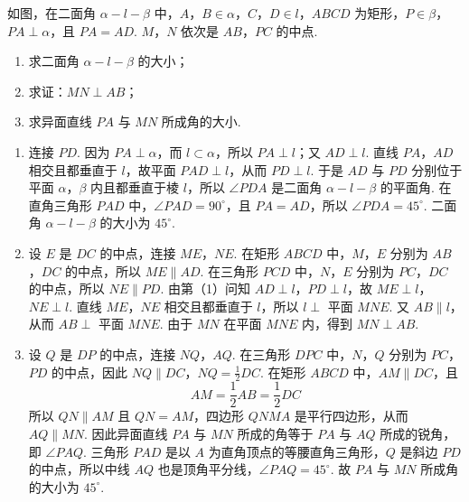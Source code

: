 \begin{problem}
如图，在二面角 \(\alpha-l-\beta\) 中，\(A\)，\(B\in\alpha\)，\(C\)，\(D\in l\)，\(ABCD\) 为矩形，\(P\in\beta\)，\(PA\perp\alpha\)，且 \(PA=AD\). \(M\)，\(N\) 依次是 \(AB\)，\(PC\) 的中点.

\begin{enumerate}
\item 求二面角 \(\alpha-l-\beta\) 的大小；
\item 求证：\(MN\perp AB\)；
\item 求异面直线 \(PA\) 与 \(MN\) 所成角的大小.
\end{enumerate}

\end{problem}

\begin{solution}
\begin{enumerate}
\item 连接 \(PD\). 因为 \(PA\perp\alpha\)，而 \(l\subset\alpha\)，所以 \(PA\perp l\)；又 \(AD\perp l\). 直线 \(PA\)，\(AD\) 相交且都垂直于 \(l\)，故平面 \(PAD\perp l\)，从而 \(PD\perp l\). 于是 \(AD\) 与 \(PD\) 分别位于平面 \(\alpha\)，\(\beta\) 内且都垂直于棱 \(l\)，所以 \(\angle PDA\) 是二面角 \(\alpha-l-\beta\) 的平面角. 在直角三角形 \(PAD\) 中，\(\angle PAD=90^\circ\)，且 \(PA=AD\)，所以 \(\angle PDA=45^\circ\). 二面角 \(\alpha-l-\beta\) 的大小为 \(45^\circ\).

\item 设 \(E\) 是 \(DC\) 的中点，连接 \(ME\)，\(NE\). 在矩形 \(ABCD\) 中，\(M\)，\(E\) 分别为 \(AB\)，\(DC\) 的中点，所以 \(ME\parallel AD\). 在三角形 \(PCD\) 中，\(N\)，\(E\) 分别为 \(PC\)，\(DC\) 的中点，所以 \(NE\parallel PD\). 由第（1）问知 \(AD\perp l\)，\(PD\perp l\)，故 \(ME\perp l\)，\(NE\perp l\). 直线 \(ME\)，\(NE\) 相交且都垂直于 \(l\)，所以 \(l\perp\) 平面 \(MNE\). 又 \(AB\parallel l\)，从而 \(AB\perp\) 平面 \(MNE\). 由于 \(MN\) 在平面 \(MNE\) 内，得到 \(MN\perp AB\).

\item 设 \(Q\) 是 \(DP\) 的中点，连接 \(NQ\)，\(AQ\). 在三角形 \(DPC\) 中，\(N\)，\(Q\) 分别为 \(PC\)，\(PD\) 的中点，因此
\(NQ\parallel DC\)，\(NQ=\frac{1}{2}DC\).
在矩形 \(ABCD\) 中，\(AM\parallel DC\)，且
\[
AM=\frac{1}{2}AB=\frac{1}{2}DC
\]
所以 \(QN\parallel AM\) 且 \(QN=AM\)，四边形 \(QNMA\) 是平行四边形，从而 \(AQ\parallel MN\). 因此异面直线 \(PA\) 与 \(MN\) 所成的角等于 \(PA\) 与 \(AQ\) 所成的锐角，即 \(\angle PAQ\). 三角形 \(PAD\) 是以 \(A\) 为直角顶点的等腰直角三角形，\(Q\) 是斜边 \(PD\) 的中点，所以中线 \(AQ\) 也是顶角平分线，\(\angle PAQ=45^\circ\). 故 \(PA\) 与 \(MN\) 所成角的大小为 \(45^\circ\).
\end{enumerate}
\end{solution}

